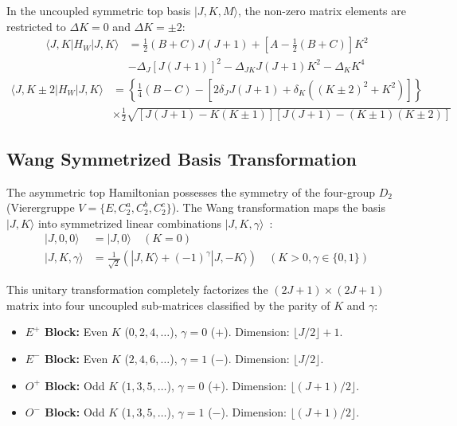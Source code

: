 \documentclass[aps,jcp,reprint,twocolumn,superscriptaddress,showpacs,amsmath,amssymb]{revtex4-2}
\begin{document}
In the uncoupled symmetric top basis $|J, K, M\rangle$, the non-zero matrix elements are restricted to $\Delta K = 0$ and $\Delta K = \pm 2$:
\begin{align}
\langle J, K | H_W | J, K \rangle &= \frac{1}{2}(B+C) J(J+1) + \left[A - \frac{1}{2}(B+C)\right] K^2 \nonumber \\
&- \Delta_J [J(J+1)]^2 - \Delta_{JK} J(J+1) K^2 - \Delta_K K^4
\end{align}
\begin{align}
\langle J, K \pm 2 | H_W | J, K \rangle &= \left\{ \frac{1}{4}(B - C) - \left[2\delta_J J(J+1) + \delta_K ((K \pm 2)^2 + K^2)\right] \right\} \nonumber \\
&\times \frac{1}{2} \sqrt{[J(J+1) - K(K \pm 1)][J(J+1) - (K \pm 1)(K \pm 2)]}
\end{align}

\subsection{Wang Symmetrized Basis Transformation}
The asymmetric top Hamiltonian possesses the symmetry of the four-group $D_2$ (Vierergruppe $V = \{E, C_2^a, C_2^b, C_2^c\}$). The Wang transformation maps the basis $|J, K\rangle$ into symmetrized linear combinations $|J, K, \gamma\rangle$~\cite{wang1929degree}:
\begin{align}
|J, 0, 0\rangle &= |J, 0\rangle \quad (K = 0) \\
|J, K, \gamma\rangle &= \frac{1}{\sqrt{2}} (|J, K\rangle + (-1)^\gamma |J, -K\rangle) \quad (K > 0, \gamma \in \{0, 1\})
\end{align}

This unitary transformation completely factorizes the $(2J+1) \times (2J+1)$ matrix into four uncoupled sub-matrices classified by the parity of $K$ and $\gamma$:
\begin{itemize}
    \item \textbf{$E^+$ Block:} Even $K$ ($0, 2, 4, \dots$), $\gamma = 0$ ($+$). Dimension: $\lfloor J/2 \rfloor + 1$.
    \item \textbf{$E^-$ Block:} Even $K$ ($2, 4, 6, \dots$), $\gamma = 1$ ($-$). Dimension: $\lfloor J/2 \rfloor$.
    \item \textbf{$O^+$ Block:} Odd $K$ ($1, 3, 5, \dots$), $\gamma = 0$ ($+$). Dimension: $\lfloor (J+1)/2 \rfloor$.
    \item \textbf{$O^-$ Block:} Odd $K$ ($1, 3, 5, \dots$), $\gamma = 1$ ($-$). Dimension: $\lfloor (J+1)/2 \rfloor$.
\end{itemize}
\end{document}
